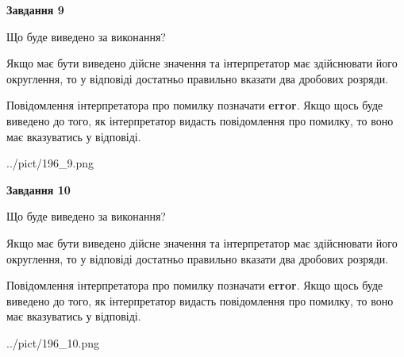 \documentclass[12pt, ukrainian]{article}
\begin{document}
{\begin {Large}
{\begin {center}\textbf{Завдання 9}\end {center}}\par
Що буде виведено за виконання? \par

Якщо має бути виведено дійсне значення та інтерпретатор має здійснювати його округлення, 
то у відповіді достатньо правильно вказати два дробових розряди.

Повідомлення інтерпретатора про помилку позначати \textbf{error}.
Якщо щось буде виведено до того, як інтерпретатор видасть повідомлення про помилку, 
то воно має вказуватись у відповіді. \par

\begin{center}
	{../pict/196_9.png}
\end{center}
\newpage

{\begin {center}\textbf{Завдання 10}\end {center}}\par
Що буде виведено за виконання? \par

Якщо має бути виведено дійсне значення та інтерпретатор має здійснювати його округлення, 
то у відповіді достатньо правильно вказати два дробових розряди.

Повідомлення інтерпретатора про помилку позначати \textbf{error}.
Якщо щось буде виведено до того, як інтерпретатор видасть повідомлення про помилку, 
то воно має вказуватись у відповіді. \par

\begin{center}
	{../pict/196_10.png}
\end{center}
\newpage

\end {Large}}
\end{document}

